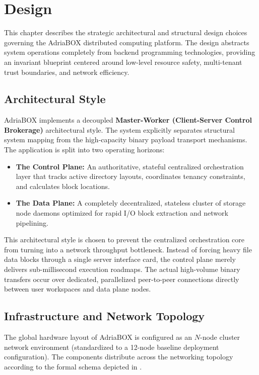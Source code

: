 \section{Design}
\label{sec:design}

This chapter describes the strategic architectural and structural design choices governing the AdriaBOX distributed computing platform. The design abstracts system operations completely from backend programming technologies, providing an invariant blueprint centered around low-level resource safety, multi-tenant trust boundaries, and network efficiency.

\subsection{Architectural Style}
AdriaBOX implements a decoupled \textbf{Master-Worker (Client-Server Control Brokerage)} architectural style. The system explicitly separates structural system mapping from the high-capacity binary payload transport mechanisms. The application is split into two operating horizons:
\begin{itemize}
    \item \textbf{The Control Plane:} An authoritative, stateful centralized orchestration layer that tracks active directory layouts, coordinates tenancy constraints, and calculates block locations.
    \item \textbf{The Data Plane:} A completely decentralized, stateless cluster of storage node daemons optimized for rapid I/O block extraction and network pipelining.
\end{itemize}

This architectural style is chosen to prevent the centralized orchestration core from turning into a network throughput bottleneck. Instead of forcing heavy file data blocks through a single server interface card, the control plane merely delivers sub-millisecond execution roadmaps. The actual high-volume binary transfers occur over dedicated, parallelized peer-to-peer connections directly between user workspaces and data plane nodes.

\subsection{Infrastructure and Network Topology}
The global hardware layout of AdriaBOX is configured as an $N$-node cluster network environment (standardized to a 12-node baseline deployment configuration). The components distribute across the networking topology according to the formal schema depicted in .

